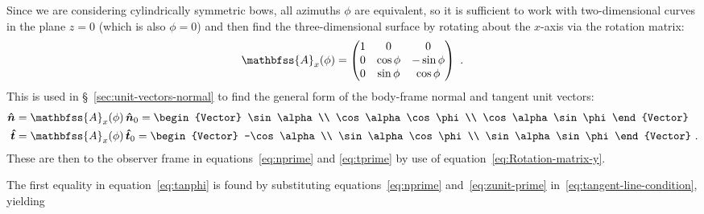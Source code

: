 Since we are considering cylindrically symmetric bows, all azimuths
\(\phi\) are equivalent, so it is sufficient to work with two-dimensional
curves in the plane \(z = 0\) (which is also \(\phi = 0\)) and then find
the three-dimensional surface by rotating about the \(x\)-axis via the
rotation matrix:
\begin{equation}
  \label{eq:Rotation-matrix-x}
  \mathbfss{A}_x(\phi) = 
   \begin{pmatrix}
    1 & 0 & 0 \\
    0 &\cos\phi & -\sin\phi \\
    0 &\sin\phi & \cos\phi 
  \end{pmatrix} \ .
\end{equation}
This is used in \S~\ref{sec:unit-vectors-normal} to find the general
form of the body-frame normal and tangent unit vectors:
\begin{align}
  \uvec{n} &= \mathbfss{A}_x(\phi) \, \uvec{n}_0 =
  \begin{Vector}
    \sin\alpha \\ \cos\alpha\cos\phi \\ \cos\alpha\sin\phi
  \end{Vector} \\
  \uvec{t} &= \mathbfss{A}_x(\phi) \, \uvec{t}_0 =
  \begin{Vector}
    -\cos\alpha \\ \sin\alpha\cos\phi \\ \sin\alpha\sin\phi
  \end{Vector} \ . 
\end{align}
These are then to the observer frame in equations~\eqref{eq:nprime}
and \eqref{eq:tprime} by use of equation~\eqref{eq:Rotation-matrix-y}.

The first equality in equation~\eqref{eq:tanphi} is found by
substituting equations~\eqref{eq:nprime} and~\eqref{eq:zunit-prime}
in~\eqref{eq:tangent-line-condition}, yielding


